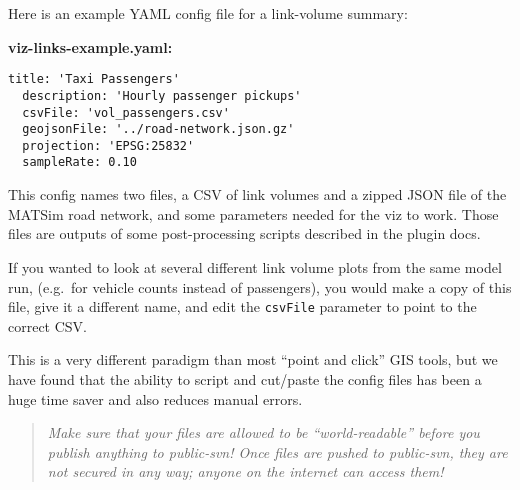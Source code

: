 Here is an example YAML config file for a link-volume summary:

\textbf{viz-links-example.yaml:}

\begin{lstlisting}[]
  title: 'Taxi Passengers'
  description: 'Hourly passenger pickups'
  csvFile: 'vol_passengers.csv'
  geojsonFile: '../road-network.json.gz'
  projection: 'EPSG:25832'
  sampleRate: 0.10
\end{lstlisting}

This config names two files, a CSV of link volumes and a zipped JSON
file of the MATSim road network, and some parameters needed for the viz
to work. Those files are outputs of some post-processing scripts
described in the plugin docs.

If you wanted to look at several different link volume plots from the
same model run, (e.g.~for vehicle counts instead of passengers), you
would make a copy of this file, give it a different name, and edit the
\texttt{csvFile} parameter to point to the correct CSV.

This is a very different paradigm than most ``point and click'' GIS
tools, but we have found that the ability to script and cut/paste the
config files has been a huge time saver and also reduces manual errors.

\begin{quote}
\emph{Make sure that your files are allowed to be ``world-readable'' before
you publish anything to public-svn! Once files are pushed to public-svn,
they are not secured in any way; anyone on the internet can access them!}
\end{quote}
